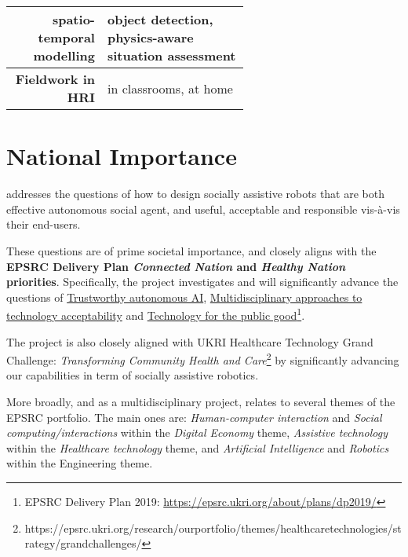 \begin{table}[h]
\begin{tabular}{rp{0.6\linewidth}}
        spatio-temporal modelling & \small object
        detection\cite{wallbridge2017qualitative}, physics-aware situation
        assessment\cite{lemaignan2018underworlds}\cite{sallami2019simulation} \\
        \midrule
        \textbf{Fieldwork in HRI} & \small in
        classrooms\cite{hood2015when, lemaignan2016learning, jacq2016building,
        baxter2015wider,kennedy2016cautious,senft2018robots}, at home\cite{mondada2015ranger}\\
        \bottomrule
    \end{tabular}
    \label{pi-expertise}
\end{table}


\section{National Importance}


\project addresses the questions of how to design socially assistive robots that
are both effective autonomous social agent, and useful, acceptable and
responsible vis-à-vis their end-users.

These questions are of prime societal importance, and \project closely
aligns with the \textbf{EPSRC Delivery Plan \emph{Connected Nation} and
\emph{Healthy Nation} priorities}. Specifically, the project
investigates and will significantly advance the questions of \ul{Trustworthy
autonomous AI}, \ul{Multidisciplinary approaches to technology acceptability}
and \ul{Technology for the public good}\footnote{EPSRC Delivery Plan 2019:
\url{https://epsrc.ukri.org/about/plans/dp2019/}}.

The project is also closely aligned with UKRI Healthcare Technology Grand
Challenge: \emph{Transforming Community Health and
Care}\footnote{https://epsrc.ukri.org/research/ourportfolio/themes/healthcaretechnologies/strategy/grandchallenges/}
by significantly advancing our capabilities in term of socially assistive
robotics.

More broadly, and as a multidisciplinary project, \project relates to several
themes of the EPSRC portfolio. The main ones are: \emph{Human-computer
interaction} and \emph{Social computing/interactions} within the \emph{Digital
Economy} theme, \emph{Assistive technology} within the \emph{Healthcare
technology} theme, and \emph{Artificial Intelligence} and \emph{Robotics} within
the Engineering theme.


